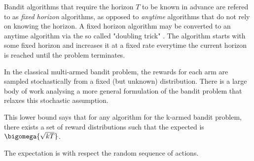 Bandit algorithms that require the horizon $T$ to be known in advance are refered to as \emph{fixed horizon} algorithms, as opposed to \emph{anytime} algorithms that do not rely on knowing the horizon. A fixed horizon algorithm may be converted to an anytime algorithm via the so called "doubling trick" \citep{}. The algorithm starts with some fixed horizon and increases it at a fixed rate everytime the current horizon is reached until the problem terminates. 

In the classical multi-armed bandit problem, the rewards for each arm are sampled stochastically from a fixed (but unknown) distribution. There is a large body of work analysing a more general formulation of the bandit problem that relaxes this stochastic assumption. 

This lower bound says that for any algorithm for the k-armed bandit problem, there exists a set of reward distributions such that the expected is $\bigomega{\sqrt{kT}}$.

The expectation is with respect the random sequence of actions. 
